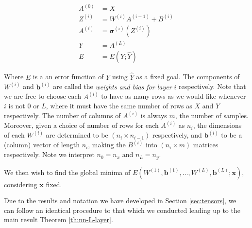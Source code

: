 \documentclass[a4paper]{article}
\theoremstyle{plain} %
\theoremstyle{definition} %
\numberwithin{equation}{subsection}
\newcommand{\vx}{{\textbf{x}}}
\newcommand{\vb}{{\textbf{b}}}
\newcommand{\vsigma}{{\bm{\sigma}}} %
\newcommand{\Yh}{{\widehat{Y}}}
\begin{document}
\begin{equation}\label{eq:matrix-layer-forward-prop}
\begin{aligned}
  A^{(0)} &= X \\ 
  Z^{(i)} &= W^{(i)} A^{(i-1)} + B^{(i)} \\
  A^{(i)} &= \vsigma^{(i)} \left(Z^{(i)}\right) \\
  Y &= A^{(L)} \\
  E &= E(Y; \Yh)
\end{aligned}
\end{equation}

Where $E$ is a an error function of $Y$ using $\Yh$ as a fixed goal. The components of $W^{(i)}$ and $\vb^{(i)}$ are called the \emph{weights and bias for layer $i$} respectively. 
Note that we are free to choose each $A^{(i)}$ to have as many rows as we would like whenever $i$ is not $0$ or $L$, 
where it must have the same number of rows as $X$ and $Y$ respectively. 
The number of columns of $A^{(i)}$ is always $m$, the number of samples.
Moreover, given a choice of number of rows for each $A^{(i)}$ as $n_i$, the dimensions of each $W^{(i)}$ are 
determined to be $(n_{i} \times n_{i-1})$ respectively, and $\vb^{(i)}$ to be a (column) vector of length $n_i$, making the $B^{(i)}$ into $(n_i \times m)$ matrices respectively. 
Note we interpret $n_0 = n_x$ and $n_L = n_y$.

We then wish to find the global minima of $E(W^{(1)},\vb^{(1)}, \dots, W^{(L)}, \vb^{(L)}; \vx) $, considering $\vx$ fixed.

Due to the results and notation we have developed in Section \ref{sec:tensors}, we can follow an identical procedure to that which we conducted
leading up to the main result Theorem \ref{th:nn-L-layer}.
\end{document}
